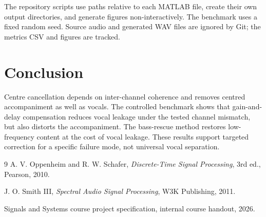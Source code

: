 \documentclass[11pt,a4paper]{article}
\begin{document}
The repository scripts use paths relative to each MATLAB file, create their own
output directories, and generate figures non-interactively. The benchmark uses
a fixed random seed. Source audio and generated WAV files are ignored by Git;
the metrics CSV and figures are tracked.

\section{Conclusion}

Centre cancellation depends on inter-channel coherence and removes centred
accompaniment as well as vocals. The controlled benchmark shows that gain-and-delay
compensation reduces vocal leakage under the tested channel mismatch, but also
distorts the accompaniment. The bass-rescue method restores low-frequency
content at the cost of vocal leakage. These results support targeted correction
for a specific failure mode, not universal vocal separation.

\begin{thebibliography}{9}
A. V. Oppenheim and R. W. Schafer,
\textit{Discrete-Time Signal Processing}, 3rd ed., Pearson, 2010.

J. O. Smith III,
\textit{Spectral Audio Signal Processing}, W3K Publishing, 2011.

Signals and Systems course project specification, internal course handout, 2026.
\end{thebibliography}
\end{document}
